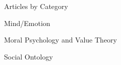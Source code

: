 \documentclass[%
  11pt,%
]{article}
\begin{document}
\begin{htmlsection}{Articles by Category}
\begin{htmlsubsection}{Mind/Emotion}
\end{htmlsubsection}

\begin{htmlsubsection}{Moral Psychology and Value Theory}

  \printbibliography[filter=myarticle,keyword=moral psychology]

\end{htmlsubsection}

\begin{htmlsubsection}{Social Ontology}

  \printbibliography[filter=myarticle,keyword={social ontology}]


\end{htmlsubsection}
\end{htmlsection}
\end{document}
